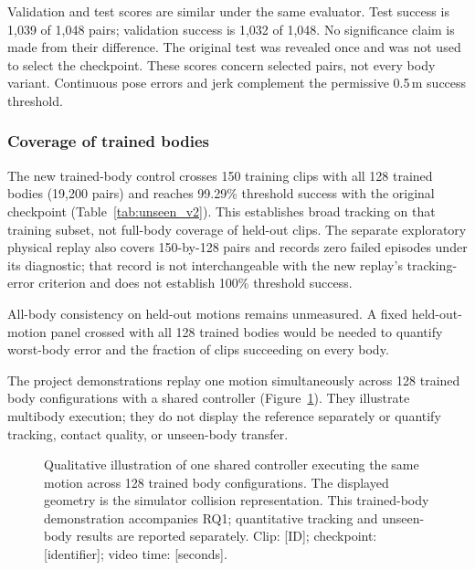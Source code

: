 \documentclass[11pt]{article}
\begin{document}
Validation and test scores are similar under the same evaluator. Test
success is 1,039 of 1,048 pairs; validation success is 1,032 of 1,048. No
significance claim is made from their difference. The original test was
revealed once and was not used to select the checkpoint. These scores concern
selected pairs, not every body variant. Continuous pose errors and jerk
complement the permissive 0.5\,m success threshold.

\subsubsection{Coverage of trained bodies}\label{sec:trained_consistency}
The new trained-body control crosses 150 training clips with all 128
trained bodies (19,200 pairs) and reaches 99.29\% threshold success with the
original checkpoint (Table~\ref{tab:unseen_v2}). This establishes broad
tracking on that training subset, not full-body coverage of held-out clips.
The separate exploratory physical replay also covers 150-by-128 pairs and
records zero failed episodes under its diagnostic; that record is not
interchangeable with the new replay's tracking-error criterion and does not
establish 100\% threshold success.

All-body consistency on held-out motions remains unmeasured. A fixed
held-out-motion panel crossed with all 128 trained bodies would be needed
to quantify worst-body error and the fraction of clips succeeding on every body.

The project demonstrations replay one motion simultaneously across 128
trained body configurations with a shared controller
(Figure~\ref{fig:trained_multibody_demo}). They illustrate multibody execution;
they do not display the reference separately or quantify tracking, contact
quality, or unseen-body transfer.

\begin{figure}[t]
\centering
{}
\caption{Qualitative illustration of one shared controller executing the
same motion across 128 trained body configurations. The displayed geometry
is the simulator collision representation. This trained-body demonstration
accompanies RQ1; quantitative tracking and unseen-body results are reported
separately.
Clip: [ID]; checkpoint: [identifier]; video time: [seconds].}
\label{fig:trained_multibody_demo}
\end{figure}
\end{document}
